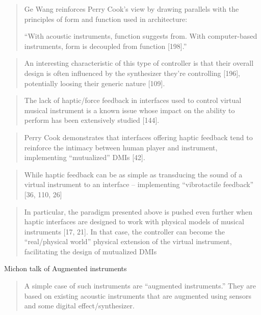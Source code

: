 \begin{quotation}
Ge Wang reinforces Perry Cook’s view by drawing parallels with the principles of
form and function used in architecture:
 
“With acoustic instruments, function suggests from. With computer-based
instruments, form is decoupled from function [198].”
\end{quotation}

\begin{quotation}
    An interesting characteristic of this type of controller is that their
    overall design is often influenced by the synthesizer they’re controlling
    [196], potentially loosing their generic nature [109].
\end{quotation}


\begin{quotation}
    The lack of haptic/force feedback in interfaces used to control virtual
    musical instrument is a known issue whose impact on the ability to perform
    has been extensively studied [144].
\end{quotation}

\begin{quotation}
    Perry Cook demonstrates that interfaces offering haptic feedback tend to
    reinforce the intimacy between human player and instrument, implementing
    “mutualized” DMIs [42].
\end{quotation}


\begin{quotation}
    While haptic feedback can be as simple as transducing the sound of a virtual
    instrument to an interface – implementing “vibrotactile feedback” [36, 110,
    26] 
\end{quotation}

\begin{quotation}
    In particular, the paradigm presented above is pushed even further when
    haptic interfaces are designed to work with physical models of musical
    instruments [17, 21]. In that case, the controller can become the
    “real/physical world” physical extension of the virtual instrument,
    facilitating the design of mutualized DMIs
\end{quotation}

Michon talk of Augmented instruments

\begin{quotation}
    A simple case of such instruments are “augmented instruments.” They are
    based on existing acoustic instruments that are augmented using sensors and
    some digital effect/synthesizer.
\end{quotation}

